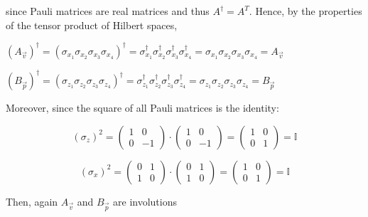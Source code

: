 \documentclass{Configuration_Files/PoliMi3i_thesis}
\begin{document}
since Pauli matrices are real matrices and thus $A^{\dagger}=A^T$.
Hence, by the properties of the tensor product of Hilbert spaces,

\begin{center}
	$(A_{\vec{v}})^{\dagger} = (\sigma_{x_1} \sigma_{x_2} \sigma_{x_3} \sigma_{x_4})^{\dagger} = \sigma_{x_1}^{\dagger} \sigma_{x_2}^{\dagger} \sigma_{x_3}^{\dagger} \sigma_{x_4}^{\dagger} = \sigma_{x_1} \sigma_{x_2} \sigma_{x_3} \sigma_{x_4} = A_{\vec{v}}$ \newline
	
	$(B_{\vec{p}})^{\dagger} = (\sigma_{z_1} \sigma_{z_2} \sigma_{z_3} \sigma_{z_4})^{\dagger} = \sigma_{z_1}^{\dagger} \sigma_{z_2}^{\dagger} \sigma_{z_3}^{\dagger} \sigma_{z_4}^{\dagger} = \sigma_{z_1} \sigma_{z_2} \sigma_{z_3} \sigma_{z_4} = B_{\vec{p}}$ \newline
\end{center}

Moreover, since the square of all Pauli matrices is the identity:\newline

\[
\text{$( \sigma_z )^{2}$} = 
\begin{pmatrix}
	1 & 0 \\
	0 & -1
\end{pmatrix} \cdot
\begin{pmatrix}
	1 & 0 \\
	0 & -1
\end{pmatrix} =
\begin{pmatrix}
	1 & 0 \\
	0 & 1
\end{pmatrix}
= \text{$\mathbb{I}$}
\]


\[
\text{$( \sigma_x )^{2}$} = 
\begin{pmatrix}
	0 & 1 \\
	1 & 0
\end{pmatrix} \cdot
\begin{pmatrix}
	0 & 1 \\
	1 & 0
\end{pmatrix} =
\begin{pmatrix}
	1 & 0 \\
	0 & 1
\end{pmatrix}
= \text{$\mathbb{I}$}
\]\newline


Then, again $A_{\vec{v}}$ and $B_{\vec{p}}$ are involutions \newline
\end{document}
